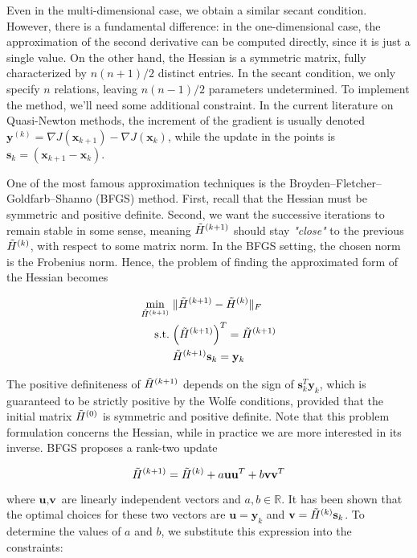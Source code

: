 \documentclass{article}
\numberwithin{equation}{subsection}
\begin{document}
Even in the multi-dimensional case, we obtain a similar secant condition. However, there is a fundamental difference: in the one-dimensional case, the approximation of the second derivative can be computed directly, since it is just a single value. On the other hand, the Hessian is a symmetric matrix, fully characterized by $n(n+1)/2$ distinct entries. In the secant condition, we only specify $n$ relations, leaving $n(n-1)/2$ parameters undetermined. To implement the method, we'll need some additional constraint. In the current literature on Quasi-Newton methods, the increment of the gradient is usually denoted $\textbf{y}^{(k)} = \nabla J(\textbf{x}_{k+1}) - \nabla J(\textbf{x}_k)$, while the update in the points is $\textbf{s}_k = (\textbf{x}_{k+1} - \textbf{x}_k)$. 

One of the most famous approximation techniques is the Broyden–Fletcher–Goldfarb–Shanno (BFGS) method. First, recall that the Hessian must be symmetric and positive definite. Second, we want the successive iterations to remain stable in some sense, meaning $\Tilde{H}^{(k+1)}$ should stay \textit{"close"} to the previous $\Tilde{H}^{(k)}$, with respect to some matrix norm. In the BFGS setting, the chosen norm is the Frobenius norm. Hence, the problem of finding the approximated form of the Hessian becomes

\begin{align}
    \min_{\Tilde{H}^{(k+1)}} \;& \Vert \Tilde{H}^{(k+1)} - \Tilde{H}^{(k)} \Vert_F \\
    \text{s.t.} \;& \Big( \Tilde{H}^{(k+1)} \Big)^T = \Tilde{H}^{(k+1)} \notag \\
                 & \Tilde{H}^{(k+1)} \mathbf{s}_k = \mathbf{y}_k \notag
\end{align}

The positive definiteness of $\Tilde{H}^{(k+1)}$ depends on the sign of $\textbf{s}_k^T \textbf{y}_k$, which is guaranteed to be strictly positive by the Wolfe conditions, provided that the initial matrix $\Tilde{H}^{(0)}$ is symmetric and positive definite. Note that this problem formulation concerns the Hessian, while in practice we are more interested in its inverse. BFGS proposes a rank-two update

\begin{equation*}
    \Tilde{H}^{(k+1)} = \Tilde{H}^{(k)} + a \textbf{u}\textbf{u}^T + b \textbf{v} \textbf{v}^T
\end{equation*}

where $\textbf{u},\textbf{v}$ are linearly independent vectors and $a,b \in \mathbb{R}$. It has been shown that the optimal choices for these two vectors are $\textbf{u} = \textbf{y}_k$ and $\textbf{v} = \Tilde{H}^{(k)} \textbf{s}_k$. To determine the values of $a$ and $b$, we substitute this expression into the constraints:
\end{document}

